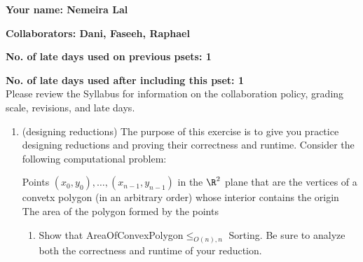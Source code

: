 \documentclass[11pt]{article}
\begin{document}

\textbf{Your name: Nemeira Lal}

\textbf{Collaborators: Dani, Faseeh, Raphael}

\textbf{No. of late days used on previous psets: 1}

\textbf{No. of late days used after including this pset: 1}
\\

Please review the Syllabus for information on the collaboration 
policy, grading scale, revisions, and late days.

\begin{enumerate}
     \item  (designing reductions) 
     The purpose of this exercise is to give you practice designing reductions and proving their correctness and runtime.
    Consider the following computational problem:

    {Points $(x_0,y_0),\ldots,(x_{n-1},y_{n-1})$ in the $\R^2$ plane that are the vertices of a convetx polygon (in an arbitrary order) whose interior contains the origin}
    {The area of the polygon formed by the points}


    \begin{enumerate}
        \item \label{part:polar} 
        Show that AreaOfConvexPolygon$\leq_{O(n),n}$ Sorting.  Be sure to analyze both the correctness and runtime of your reduction.


\end{enumerate}
\end{enumerate}
\end{document}
